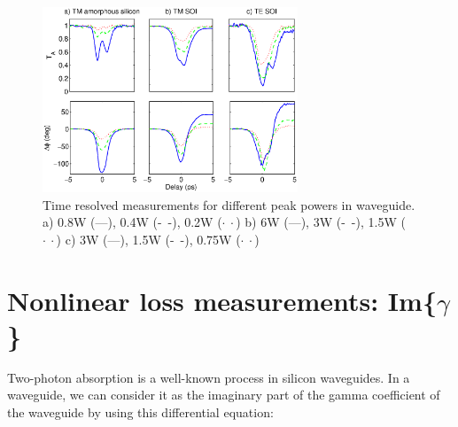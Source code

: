 \documentclass[10pt,letterpaper]{article}
\begin{document}







\begin{figure}[htb]
    \centering
    \includegraphics[width=0.68\textwidth]{timeResAmorfoTm10mmP13b_1w_0p5_0p25_0p125_amp_SOI_2}
    \caption{Time resolved measurements for different peak powers in waveguide. a) 0.8W (---), 0.4W (-~-), 0.2W ($\cdot~\cdot$) b) 6W (---), 3W (-~-), 1.5W ($\cdot~\cdot$) c) 3W (---), 1.5W (-~-), 0.75W ($\cdot~\cdot$) }
    \label{fig:timeResolvesMeasurements}
\end{figure}



\section{Nonlinear loss measurements: Im\{$ \gamma $\}}
\label{sec:imGamma}
Two-photon absorption is a well-known process in silicon waveguides. In a waveguide, we can consider it as the imaginary part of the gamma coefficient of the waveguide by using this differential equation:
\end{document}
